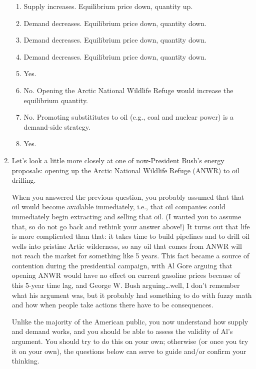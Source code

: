 \documentclass{article}
\begin{document}
\begin{enumerate}
\begin{KEY}
    \begin{enumerate}
    \item Supply increases. Equilibrium price down, quantity up.
    \item Demand decreases. Equilibrium price down, quantity down.
    \item Demand decreases. Equilibrium price down, quantity down.
    \item Demand decreases. Equilibrium price down, quantity down.
    \item Yes.
    \item No. Opening the Arctic National Wildlife Refuge would increase the equilibrium quantity.
    \item No. Promoting substititutes to oil (e.g., coal and nuclear power) is a demand-side strategy.
    \item Yes.
    \end{enumerate}
\end{KEY}

\clearpage


\item \begin{EXAM} Let's look a little more closely at one of now-President Bush's energy proposals: opening up the Arctic National Wildlife Refuge (ANWR) to oil drilling.

When you answered the previous question, you probably assumed that that oil would become available immediately, i.e., that oil companies could immediately begin extracting and selling that oil. (I wanted you to assume that, so do not go back and rethink your answer above!) It turns out that life is more complicated than that: it takes time to build pipelines and to drill oil wells into pristine Artic wilderness, so any oil that comes from ANWR will not reach the market for something like 5 years. This fact became a source of contention during the presidential campaign, with Al Gore arguing that opening ANWR would have no effect on current gasoline prices because of this 5-year time lag, and George W. Bush arguing\ldots well, I don't remember what his argument was, but it probably had something to do with fuzzy math and how when people take actions there have to be consequences.

Unlike the majority of the American public, you now understand how supply and demand works, and you should be able to assess the validity of Al's argument. You should try to do this on your own; otherwise (or once you try it on your own), the questions below can serve to guide and/or confirm your thinking.


\end{EXAM}
\end{enumerate}
\end{document}
